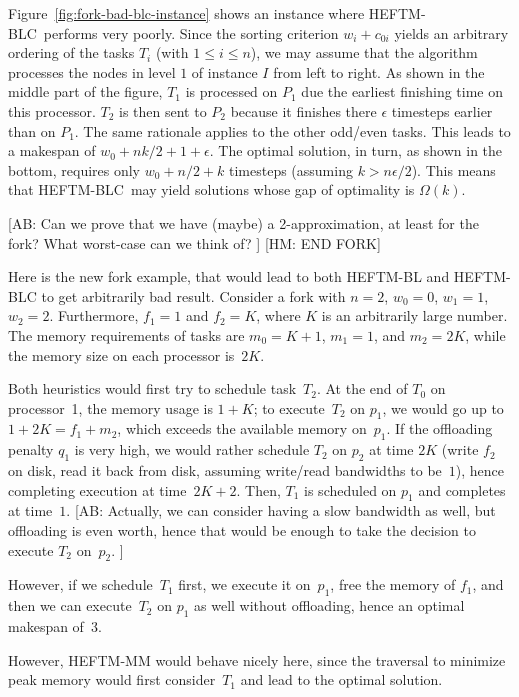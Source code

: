 \documentclass[conference]{IEEEtran}
\newcommand{\algo}[1]{\textsc{#1}}
\newcommand{\heftmm}{\algo{HEFTM-MM}\xspace}
\newcommand{\heftbl}{\algo{HEFTM-BL}\xspace}
\newcommand{\heftblc}{\algo{HEFTM-BLC}\xspace}
\newcommand{\hmey}[1]{{\color{red}[HM: #1]}}
\newcommand{\AB}[1]{{\color{purple}[AB: #1]}}
\begin{document}
  
Figure~\ref{fig:fork-bad-blc-instance} shows an instance where \heftblc\ performs very poorly.
Since the sorting criterion $w_i + c_{0i}$ yields an arbitrary ordering of the tasks $T_i$ (with $1 \leq i \leq n$), we may
assume that the algorithm processes the nodes in level $1$ of instance $I$ from left to right. 
As shown in the middle part of the figure, $T_1$ is processed on $P_1$ due the earliest finishing time on this processor.
$T_2$ is then sent to $P_2$ because it finishes there $\epsilon$ timesteps earlier than on $P_1$. The same rationale applies
to the other odd/even tasks. This leads to a makespan of $w_0 + nk/2 + 1 + \epsilon$. The optimal solution, in turn, as shown in the bottom,
requires only $w_0 + n/2 + k$ timesteps (assuming $k > n\epsilon/2$). This means that \heftblc\ may yield solutions whose 
gap of optimality is $\Omega(k)$.

  
\AB{Can we prove that we have (maybe) a 2-approximation,
        at least for the fork? What worst-case can we think of? }
\hmey{END FORK}


Here is the new fork example, that would lead to both \heftbl and \heftblc to get arbitrarily bad result. 
Consider a fork with $n=2$, $w_0=0$, $w_1=1$, $w_2=2$. Furthermore, 
$f_1=1$ and $f_2=K$, where $K$ is an arbitrarily large number. 
The memory requirements of tasks are $m_0=K+1$, $m_1=1$, and $m_2=2K$, 
while the memory size on each processor is~$2K$. 

Both heuristics would first try to schedule task~$T_2$. At the end of $T_0$ on processor~1,
the memory usage is $1+K$; to execute~$T_2$ on $p_1$, we would go up to $1+2K = f_1+m_2$, which
exceeds the available memory on~$p_1$. If the offloading penalty $q_1$ is very high,
we would rather schedule $T_2$ on $p_2$ at time $2K$ (write $f_2$ on disk, read it back from disk,
assuming write/read bandwidths to be~$1$), hence completing execution at time~$2K+2$. 
Then, $T_1$ is scheduled on $p_1$ and completes at time~$1$. 
\AB{Actually, we can consider having a slow bandwidth as well, but offloading is even worth,
hence that would be enough to take the decision to execute $T_2$ on~$p_2$. }

However, if we schedule~$T_1$ first, we execute it on~$p_1$, free the memory of $f_1$, 
and then we can execute~$T_2$ on $p_1$ as well without offloading, 
hence an optimal makespan of~$3$. 

However, \heftmm would behave nicely here, since the traversal to minimize peak memory
would first consider~$T_1$ and lead to the optimal solution.  
\end{document}
